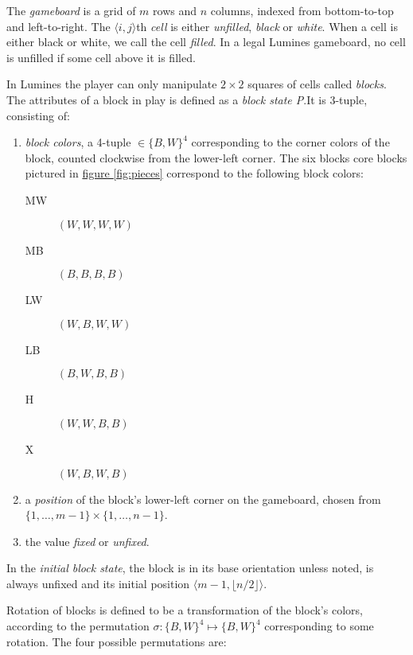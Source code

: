 \begin{description}[style=unboxed, leftmargin=0cm,labelsep=1em]
    \item[The gameboard] The \emph{gameboard} is a grid of $m$ rows and $n$ columns, indexed from bottom-to-top and left-to-right. The $\langle i,j \rangle$th \emph{cell} is either \emph{unfilled}, \emph{black} or \emph{white}. When a cell is either black or white, we call the cell \emph{filled}. In a legal Lumines gameboard, no cell is unfilled if some cell above it is filled.

    \item[Game blocks] In Lumines the player can only manipulate $2 \times 2$ squares of cells called \textit{blocks}. The attributes of a block in play is defined as a \emph{block state P}.It is 3-tuple, consisting of: 
    \begin{enumerate}
        \item \emph{block colors}, a 4-tuple $\in \{B,W\}^4$ corresponding to the corner colors of the block, counted clockwise from the lower-left corner. The six blocks core blocks pictured in \hyperref[fig:pieces]{figure \ref*{fig:pieces}} correspond to the following block colors:

        \begin{description}
            \item[MW] $(W,W,W,W)$
            \item[MB] $(B,B,B,B)$
            \item[LW] $(W,B,W,W)$
            \item[LB] $(B,W,B,B)$
            \item[H] $(W,W,B,B)$
            \item[X] $(W,B,W,B)$
        \end{description}

        \item a \emph{position} of the block's lower-left corner on the gameboard, chosen from $\{1, \ldots, m-1\} \times \{1, \ldots, n-1\}$.
        \item the value \emph{fixed} or \emph{unfixed}.
    \end{enumerate}

In the \textit{initial block state}, the block is in its base orientation unless noted, is always unfixed and its initial position $\langle m-1, \lfloor n/2 \rfloor \rangle$.

    \item[Rotating blocks] Rotation of blocks is defined to be a transformation of the block's colors, according to the permutation $\sigma: \{B,W\}^4 \mapsto \{B,W\}^4$ corresponding to some rotation. The four possible permutations are:


\end{description}
